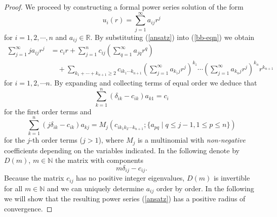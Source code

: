 \documentclass{amsart}
\theoremstyle{definition}
\theoremstyle{remark}
\numberwithin{equation}{section}
\newcommand{\R}{\mathbb{R}}  %
\newcommand{\N}{\mathbb{N}}
\begin{document}
\begin{proof}
We proceed by constructing a formal power series solution of the form 
\begin{equation}
\label{ansatz}
u_i(r) = \sum_{j = 1}^{\infty} a_{ij} r^j
\end{equation} 
for $i = 1 ,2, \cdots, n$ and $a_{ij} \in \R$. By substituting (\ref{ansatz}) into (\ref{bb-eqn}) we obtain
\begin{align*}
\sum_{j = 1}^{\infty} j a_{ij} r^j &= c_i r + \sum_{j= 1}^n c_{ij}\left( \sum_{q = 1}^{\infty} a_{jq} r^q \right)  \\ 
			& \quad  + \sum_{k_1 + \cdots + k_{n+1} \geq 2} c_{i k_1 \cdots k_{n+1}} \left(\sum_{j = 1}^{\infty} a_{k_1 j} r^j\right)^{k_1} \cdots \left(\sum_{j = 1}^{\infty} a_{k_n j} r^j\right)^{k_n} r^{k_{n+1}}
\end{align*}
for $i = 1, 2, \cdots n$. By expanding and collecting terms of equal order we deduce that
\begin{equation*}
\sum_{k = 1}^n \left(\delta_{ik} - c_{ik}\right) a_{k1} = c_i 
\end{equation*}
for the first order terms and
\begin{equation*}
\sum_{k = 1}^n\left(j \delta_{ik} - c_{ik}\right) a_{kj} = M_j(c_{ik_1k_2 \cdots k_{n+1}}; \{a_{pq}\; |\; q \leq j-1,  1 \leq p \leq n \} )
\end{equation*}
for the $j$-th order terms ($j > 1$), where $M_j$ is a multinomial with \emph{non-negative} coefficients depending on the variables indicated. In the following denote by $D(m)$, $m \in \N$ the matrix with components
\begin{equation*}
m \delta_{ij} - c_{ij}.
\end{equation*}
Because the matrix $c_{ij}$ has no positive integer eigenvalues, $D(m)$ is invertible for all $m\in \N$ and we can uniquely determine $a_{ij}$ order by order. In the following we will show that the resulting power series (\ref{ansatz}) has a positive radius of convergence. 


\end{proof}
\end{document}
